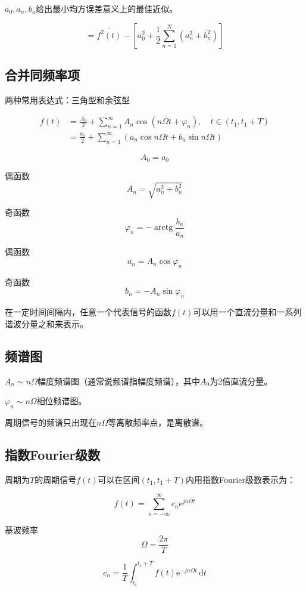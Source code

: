 \documentclass[UTF8]{ctexart}
\begin{document}
$a_0, a_n, b_n$给出最小均方误差意义上的最佳近似。

$$
= \overline{f^2(t)} - \left[ a_0^2 + \frac{1}{2} \sum_{n=1}^{N} \left( a_n^2 + b_n^2 \right) \right]
$$

\subsection{合并同频率项}

两种常用表达式：三角型和余弦型

$$
\begin{aligned}
f(t) &= \frac{A_0}{2} + \sum_{n=1}^{\infty} A_n \cos\left( n\Omega t + \varphi_n \right), \quad t \in \left( t_1, t_1 + T \right) \\
&= \frac{a_0}{2} + \sum_{n=1}^{\infty} \left( a_n \cos n\Omega t + b_n \sin n\Omega t \right)
\end{aligned}
$$

$$
A_0 = a_0
$$

偶函数
$$
A_n = \sqrt{a_n^2 + b_n^2}
$$

奇函数
$$
\varphi_n = -\operatorname{arctg}\frac{b_n}{a_n}
$$

偶函数
$$
a_n = A_n \cos\varphi_n
$$

奇函数
$$
b_n = -A_n \sin\varphi_n
$$

在一定时间间隔内，任意一个代表信号的函数$f(t)$可以用一个直流分量和一系列谐波分量之和来表示。

\subsection{频谱图}

$A_n \sim nΩ$幅度频谱图（通常说频谱指幅度频谱），其中$A_0$为2倍直流分量。

$\varphi_n \sim nΩ$相位频谱图。

周期信号的频谱只出现在$nΩ$等离散频率点，是离散谱。

\subsection{指数Fourier级数}

周期为$T$的周期信号$f(t)$可以在区间$ (t_1, t_1+T)$内用指数Fourier级数表示为：

$$
f(t) = \sum_{n=-\infty}^{\infty} c_n \mathrm{e}^{jn\Omega t}
$$

基波频率
$$
\Omega = \frac{2\pi}{T}
$$

$$
c_n = \frac{1}{T} \int_{t_1}^{t_1+T} f(t) \mathrm{e}^{-jn\Omega t} \,\mathrm{d}t
$$
\end{document}
